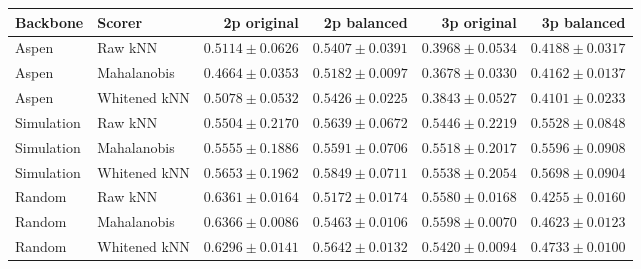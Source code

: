 \begin{tabular}{llrrrr}
\toprule
Backbone & Scorer & 2p original & 2p balanced & 3p original & 3p balanced \\
\midrule
Aspen & Raw kNN & $0.5114\pm0.0626$ & $0.5407\pm0.0391$ & $0.3968\pm0.0534$ & $0.4188\pm0.0317$ \\
Aspen & Mahalanobis & $0.4664\pm0.0353$ & $0.5182\pm0.0097$ & $0.3678\pm0.0330$ & $0.4162\pm0.0137$ \\
Aspen & Whitened kNN & $0.5078\pm0.0532$ & $0.5426\pm0.0225$ & $0.3843\pm0.0527$ & $0.4101\pm0.0233$ \\
Simulation & Raw kNN & $0.5504\pm0.2170$ & $0.5639\pm0.0672$ & $0.5446\pm0.2219$ & $0.5528\pm0.0848$ \\
Simulation & Mahalanobis & $0.5555\pm0.1886$ & $0.5591\pm0.0706$ & $0.5518\pm0.2017$ & $0.5596\pm0.0908$ \\
Simulation & Whitened kNN & $0.5653\pm0.1962$ & $0.5849\pm0.0711$ & $0.5538\pm0.2054$ & $0.5698\pm0.0904$ \\
Random & Raw kNN & $0.6361\pm0.0164$ & $0.5172\pm0.0174$ & $0.5580\pm0.0168$ & $0.4255\pm0.0160$ \\
Random & Mahalanobis & $0.6366\pm0.0086$ & $0.5463\pm0.0106$ & $0.5598\pm0.0070$ & $0.4623\pm0.0123$ \\
Random & Whitened kNN & $0.6296\pm0.0141$ & $0.5642\pm0.0132$ & $0.5420\pm0.0094$ & $0.4733\pm0.0100$ \\
\bottomrule
\end{tabular}
